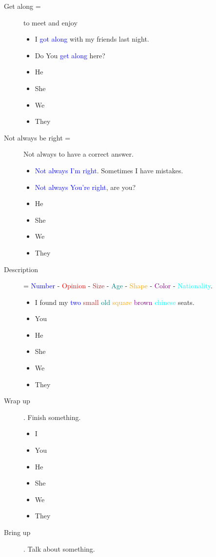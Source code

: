 \begin{multicols}{2}
\begin{description}
\item [Get along =] to meet and enjoy
  \begin{itemize}
  \item I \textcolor{blue}{got along} with my friends last night.
  \item Do You \textcolor{blue}{get along} here?
  \item He
  \item She
  \item We
  \item They
  \end{itemize}
\item [Not always be right =] Not always to have a correct answer.
  \begin{itemize}
  \item \textcolor{blue}{Not always I'm right}. Sometimes I have mistakes.
  \item \textcolor{blue}{Not always You're right}, are you?
  \item He
  \item She
  \item We
  \item They
  \end{itemize}
\item [Description] = \textcolor{blue}{Number} - \textcolor{red}{Opinion} - \textcolor{brown}{Size} - \textcolor{teal}{Age} - \textcolor{orange}{Shape} - \textcolor{purple}{Color} - \textcolor{cyan}{Nationality}.
  \begin{itemize}
  \item I found my \textcolor{blue}{two} \textcolor{brown}{small} \textcolor{teal}{old} \textcolor{orange}{square} \textcolor{purple}{brown} \textcolor{cyan}{chinese} seats.
  \item You
  \item He
  \item She
  \item We
  \item They
  \end{itemize}
\item [Wrap up]. Finish something.
  \begin{itemize}
  \item I 
  \item You 
  \item He 
  \item She 
  \item We 
  \item They 
  \end{itemize}
\item [Bring up]. Talk about something.

\end{description}
\end{multicols}

